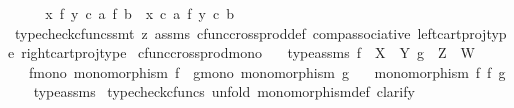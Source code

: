 \begin{isabellebody}
\ \ \isamarkupfalse%
\ \isamarkupfalse%
\ {\isachardoublequoteopen}{\isacharparenleft}{\kern0pt}x\ {\isasymtimes}\isactrlsub f\ y{\isacharparenright}{\kern0pt}\ {\isasymcirc}\isactrlsub c\ a\ {\isasymtimes}\isactrlsub f\ b\ {\isacharequal}{\kern0pt}\ {\isacharparenleft}{\kern0pt}x\ {\isasymcirc}\isactrlsub c\ a{\isacharparenright}{\kern0pt}\ {\isasymtimes}\isactrlsub f\ y\ {\isasymcirc}\isactrlsub c\ b{\isachardoublequoteclose}\isanewline
\ \ \ \ \isamarkupfalse%
\ {\isacharparenleft}{\kern0pt}typecheck{\isacharunderscore}{\kern0pt}cfuncs{\isacharcomma}{\kern0pt}smt\ {\isacharparenleft}{\kern0pt}z{}{\isacharparenright}{\kern0pt}\ assms\ cfunc{\isacharunderscore}{\kern0pt}cross{\isacharunderscore}{\kern0pt}prod{\isacharunderscore}{\kern0pt}def{}\ comp{\isacharunderscore}{\kern0pt}associative{}\ left{\isacharunderscore}{\kern0pt}cart{\isacharunderscore}{\kern0pt}proj{\isacharunderscore}{\kern0pt}type\ right{\isacharunderscore}{\kern0pt}cart{\isacharunderscore}{\kern0pt}proj{\isacharunderscore}{\kern0pt}type{\isacharparenright}{\kern0pt}\isanewline
{}\isamarkupfalse%
%
\endisatagproof
{\isafoldproof}%
%
\isadelimproof
\isanewline
%
\endisadelimproof
\isanewline
{}\isamarkupfalse%
\ cfunc{\isacharunderscore}{\kern0pt}cross{\isacharunderscore}{\kern0pt}prod{\isacharunderscore}{\kern0pt}mono{\isacharcolon}{\kern0pt}\isanewline
\ \ \ type{\isacharunderscore}{\kern0pt}assms{\isacharcolon}{\kern0pt}\ {\isachardoublequoteopen}f\ {\isacharcolon}{\kern0pt}\ X\ {\isasymrightarrow}\ Y{\isachardoublequoteclose}\ {\isachardoublequoteopen}g\ {\isacharcolon}{\kern0pt}\ Z\ {\isasymrightarrow}\ W{\isachardoublequoteclose}\isanewline
\ \ \ f{\isacharunderscore}{\kern0pt}mono{\isacharcolon}{\kern0pt}\ {\isachardoublequoteopen}monomorphism\ f{\isachardoublequoteclose}\ \ g{\isacharunderscore}{\kern0pt}mono{\isacharcolon}{\kern0pt}\ {\isachardoublequoteopen}monomorphism\ g{\isachardoublequoteclose}\isanewline
\ \ \ {\isachardoublequoteopen}monomorphism\ {\isacharparenleft}{\kern0pt}f\ {\isasymtimes}\isactrlsub f\ g{\isacharparenright}{\kern0pt}{\isachardoublequoteclose}\isanewline
%
\isadelimproof
\ \ %
\endisadelimproof
%
\isatagproof
{}\isamarkupfalse%
\ type{\isacharunderscore}{\kern0pt}assms\isanewline
{}\isamarkupfalse%
\ {\isacharparenleft}{\kern0pt}typecheck{\isacharunderscore}{\kern0pt}cfuncs{\isacharcomma}{\kern0pt}\ unfold\ monomorphism{\isacharunderscore}{\kern0pt}def{}{\isacharcomma}{\kern0pt}\ clarify{\isacharparenright}{\kern0pt}\isanewline

\end{isabellebody}
